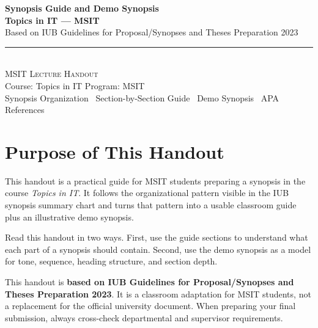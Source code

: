 \documentclass[11pt,a4paper]{article}
\begin{document}
\begin{center}
\vspace*{0.5cm}
{\Huge\bfseries\textcolor{primary}{Synopsis Guide and Demo Synopsis}}\\[8pt]
{\Large\bfseries\textcolor{primary}{Topics in IT --- MSIT}}\\[12pt]
{\large\textcolor{secondary}{Based on IUB Guidelines for Proposal/Synopses and Theses Preparation 2023}}\\[14pt]
{\color{secondary}\rule{0.78\textwidth}{1.5pt}}\\[12pt]
{\Large\textsc{MSIT Lecture Handout}}\\[6pt]
{\large\textcolor{gray!70!black}{Course: Topics in IT \quad Program: MSIT}}\\[8pt]
{\normalsize\textcolor{gray!70!black}{Synopsis Organization \textbullet\ Section-by-Section Guide \textbullet\ Demo Synopsis \textbullet\ APA References}}
\vspace{0.3cm}
\end{center}

\tableofcontents
\newpage

\section{Purpose of This Handout}

\begin{definitionbox}
This handout is a practical guide for MSIT students preparing a synopsis in the course \emph{Topics in IT}. It follows the organizational pattern visible in the IUB synopsis summary chart and turns that pattern into a usable classroom guide plus an illustrative demo synopsis.
\end{definitionbox}

\begin{conceptbox}
Read this handout in two ways. First, use the guide sections to understand what each part of a synopsis should contain. Second, use the demo synopsis as a model for tone, sequence, heading structure, and section depth.
\end{conceptbox}

\begin{alertbox}
This handout is \textbf{based on IUB Guidelines for Proposal/Synopses and Theses Preparation 2023}. It is a classroom adaptation for MSIT students, not a replacement for the official university document. When preparing your final submission, always cross-check departmental and supervisor requirements.
\end{alertbox}
\end{document}
